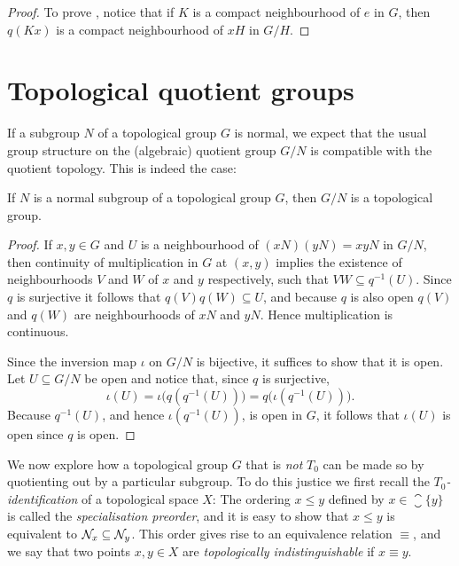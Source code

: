 \documentclass[article, a4paper, 11pt, oneside]{memoir}
\numberwithin{equation}{chapter}
\newcommand{\preim}{^{-1}}
\begin{document}
\begin{proof}
    To prove , notice that if $K$ is a compact neighbourhood of $e$ in $G$, then $q(Kx)$ is a compact neighbourhood of $xH$ in $G/H$.
\end{proof}



\section{Topological quotient groups}

If a subgroup $N$ of a topological group $G$ is normal, we expect that the usual group structure on the (algebraic) quotient group $G/N$ is compatible with the quotient topology. This is indeed the case:

\begin{theorem}
    \label{thm:topological-quotient-group}
    If $N$ is a normal subgroup of a topological group $G$, then $G/N$ is a topological group.
\end{theorem}

\begin{proof}
    If $x,y \in G$ and $U$ is a neighbourhood of $(xN)(yN) = xyN$ in $G/N$, then continuity of multiplication in $G$ at $(x,y)$ implies the existence of neighbourhoods $V$ and $W$ of $x$ and $y$ respectively, such that $VW \subseteq q\preim(U)$. Since $q$ is surjective it follows that $q(V) q(W) \subseteq U$, and because $q$ is also open $q(V)$ and $q(W)$ are neighbourhoods of $xN$ and $yN$. Hence multiplication is continuous.

    Since the inversion map $\iota$ on $G/N$ is bijective, it suffices to show that it is open. Let $U \subseteq G/N$ be open and notice that, since $q$ is surjective,
    \begin{equation*}
        \iota(U)
            = \iota \bigl( q(q\preim(U)) \bigr)
            = q \bigl( \iota(q\preim(U)) \bigr).
    \end{equation*}
    Because $q\preim(U)$, and hence $\iota(q\preim(U))$, is open in $G$, it follows that $\iota(U)$ is open since $q$ is open.
\end{proof}

We now explore how a topological group $G$ that is \emph{not} $T_0$ can be made so by quotienting out by a particular subgroup. To do this justice we first recall the \emph{$T_0$-identification} of a topological space $X$: The ordering $x \leq y$ defined by $x \in \closure{\{y\}}$ is called the \emph{specialisation preorder}, and it is easy to show that $x \leq y$ is equivalent to $\mathcal{N}_{x} \subseteq \mathcal{N}_{y}$. This order gives rise to an equivalence relation $\equiv$, and we say that two points $x,y \in X$ are \emph{topologically indistinguishable} if $x \equiv y$.
\end{document}

